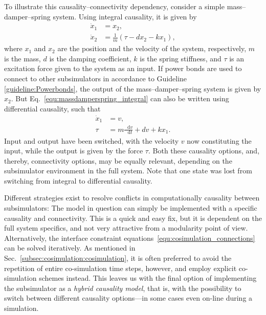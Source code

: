 \documentclass[prb,aps,showpacs,floatfix,twocolumn,10pt]{revtex4-1}
\newcommand*\diff{\mathop{}\!\mathrm{d}}
\newcommand{\sub}{subsimulator}
\theoremstyle{plain}
\theoremstyle{remark}
\begin{document}
To illustrate this causality--connectivity dependency, consider a simple mass--damper--spring system.
Using integral causality, it is given by
\begin{equation}
\label{equ:massdamperspring_integral}
\begin{split}
	\dot{x}_1
	&=
	x_2,
	\\
	\dot{x}_2
	&=
	\frac{1}{m}
	(
		\tau- d x_2 - k x_1
	)
	,
\end{split}
\end{equation}
where $x_1$ and $x_2$ are the position and the velocity of the system, respectively, $m$ is the mass, $d$ is the damping coefficient, $k$ is the spring stiffness, and $\tau$ is an excitation force given to the system as an input.
If power bonds are used to connect to other \sub{}s in accordance to Guideline \ref{guideline:Powerbonds}, the output of the mass--damper--spring system is given by $x_2$.
But Eq.~\eqref{equ:massdamperspring_integral} can also be written using differential causality, such that
\begin{equation}
\label{equ:massdamperspring_differential}
\begin{split}
	\dot{x}_1
	&=
	v,
	\\
	\tau
	&=
	m \frac{\diff v}{\diff t}
	+
	d v
	+
	k x_1
	.
\end{split}
\end{equation}
Input and output have been switched, with the velocity $v$ now constituting the input, while the output is given by the force $\tau$.
Both these causality options, and, thereby, connectivity options, may be equally relevant, depending on the \sub{} environment in the full system.
Note that one state was lost from switching from integral to differential causality.

Different strategies exist to resolve conflicts in computationally causality between \sub{}s:
The model in question can simply be implemented with a specific causality and connectivity.
This is a quick and easy fix, but it is dependent on the full system specifics, and not very attractive from a modularity point of view.
Alternatively, the interface constraint equations~\eqref{equ:cosimulation_connections} can be solved iteratively.
As mentioned in Sec.~\ref{subsec:cosimulation:cosimulation}, it is often preferred to avoid the repetition of entire co-simulation time steps, however, and employ explicit co-simulation schemes instead.
This leaves us with the final option of implementing the \sub{} as a \emph{hybrid causality model}, that is, with the possibility to switch between different causality options---in some cases even on-line during a simulation.
\end{document}

